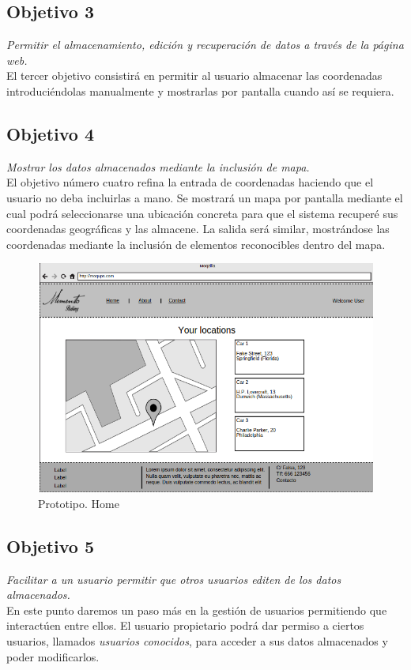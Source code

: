 \subsection{Objetivo 3}
\emph{Permitir el almacenamiento, edición y recuperación de datos a través de la página web.}\\
El tercer objetivo consistirá en permitir al usuario almacenar las coordenadas introduciéndolas manualmente y mostrarlas por pantalla cuando así se requiera.

\subsection{Objetivo 4}
\emph{Mostrar los datos almacenados mediante la inclusión de mapa.}\\
El objetivo número cuatro refina la entrada de coordenadas haciendo que el usuario no deba incluirlas a mano. Se mostrará un mapa por pantalla mediante el cual podrá seleccionarse una ubicación concreta para que el sistema recuperé sus coordenadas geográficas y las almacene. La salida será similar, mostrándose las coordenadas mediante la inclusión de elementos reconocibles dentro del mapa.

\begin{figure}[h!btp]
\centering
\includegraphics[scale=0.5, fbox={\fboxrule} 4mm]{images/02-objetivos/04-prototipo_locations.png}
\caption{Prototipo. Home}
\label{fig:prototipo_Home}
\end{figure}


\subsection{Objetivo 5}
\emph{Facilitar a un usuario permitir que otros usuarios editen de los datos almacenados.}\\
En este punto daremos un paso más en la gestión de usuarios permitiendo que interactúen entre ellos. El usuario propietario podrá dar permiso a ciertos usuarios, llamados \textit{usuarios conocidos}, para acceder a sus datos almacenados y poder modificarlos.


